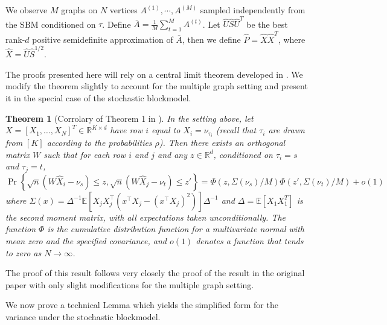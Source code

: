 \documentclass[10pt,letterpaper]{article}
\newtheorem{theorem}[fact]{Theorem}
\renewcommand{\Re}{\mathbb{R}}
\newcommand{\Ex}{\mathbb{E}}
\renewcommand{\hat}{\widehat}
\begin{document}
We observe $M$ graphs on $N$ vertices $A^{(1)}, \cdots, A^{(M)}$ sampled independently from the SBM conditioned on $\tau$.
Define $\bar{A} = \frac{1}{M} \sum_{t=1}^M A^{(t)}$. Let $\hat{U} \hat{S} \hat{U}^T$ be the best rank-$d$ positive semidefinite approximation of $\bar{A}$, then we define $\hat{P} = \hat{X} \hat{X}^T$, where $\hat{X} = \hat{U} \hat{S}^{1/2}$.




The proofs presented here will rely on a central limit theorem developed in \citet{athreya2013limit}. 
We modify the theorem slightly to account for the multiple graph setting and present it in the special case of the stochastic blockmodel.

\begin{theorem}[Corrolary of Theorem 1 in \citet{athreya2013limit}]\label{thm:clt_ext}
  In the setting above, let $X=[X_1,\dotsc,X_N]^T\in\Re^{K\times d}$ have row $i$ equal to $X_i=\nu_{\tau_i}$ (recall that $\tau_i$ are drawn from $[K]$ according to the probabilities $\rho$).
	Then there exists an orthogonal matrix $W$ such that for each row $i$ and $j$ and any $z \in \Re^{d}$, conditioned on $\tau_i=s$ and $\tau_j=t$,
  \begin{equation}
    \label{eq:4}
    \Pr\left\{\sqrt{n}( W \hat{X}_i - \nu_s ) \leq z, \sqrt{n}( W \hat{X}_j - \nu_t) \leq z'\right\}
=  \Phi(z, \Sigma(\nu_s)/M)  \Phi(z', \Sigma(\nu_t)/M) +o(1)
  \end{equation}
  where $\Sigma(x) =\Delta^{-1}\Ex[ X_j X_j^\top(x^\top X_j -(x^\top
  X_j)^2)]\Delta^{-1}$ and $\Delta=\Ex[ X_1 X_{1}^{T}]$ is the second
  moment matrix, with all expectations taken unconditionally.
  The function $\Phi$ is the cumulative distribution function for a multivariate normal with mean zero and the specified covariance, and $o(1)$ denotes a function that tends to zero as $N\to \infty$.
\end{theorem}
The proof of this result follows very closely the proof of the result in the original paper with only slight modifications for the multiple graph setting.

We now prove a technical Lemma which yields the simplified form for the variance under the stochastic blockmodel.
\end{document}
